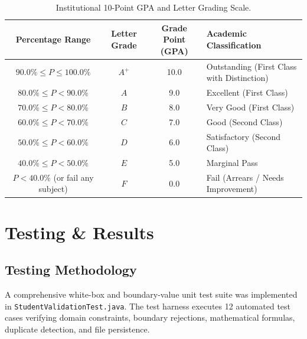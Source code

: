 \documentclass[12pt,a4paper]{report}
\begin{document}
\begin{table}[htbp]
\centering
\begin{tabularx}{\textwidth}{c c c X}
\toprule
\textbf{Percentage Range} & \textbf{Letter Grade} & \textbf{Grade Point (GPA)} & \textbf{Academic Classification} \\
\midrule
$90.0\% \le P \le 100.0\%$ & $A^+$ & 10.0 & Outstanding (First Class with Distinction) \\
$80.0\% \le P < 90.0\%$ & $A$ & 9.0 & Excellent (First Class) \\
$70.0\% \le P < 80.0\%$ & $B$ & 8.0 & Very Good (First Class) \\
$60.0\% \le P < 70.0\%$ & $C$ & 7.0 & Good (Second Class) \\
$50.0\% \le P < 60.0\%$ & $D$ & 6.0 & Satisfactory (Second Class) \\
$40.0\% \le P < 50.0\%$ & $E$ & 5.0 & Marginal Pass \\
$P < 40.0\%$ (or fail any subject) & $F$ & 0.0 & Fail (Arrears / Needs Improvement) \\
\bottomrule
\end{tabularx}
\caption{Institutional 10-Point GPA and Letter Grading Scale.}
\end{table}

\chapter{Testing \& Results}

\section{Testing Methodology}
A comprehensive white-box and boundary-value unit test suite was implemented in \texttt{StudentValidationTest.java}. The test harness executes 12 automated test cases verifying domain constraints, boundary rejections, mathematical formulas, duplicate detection, and file persistence.
\end{document}
